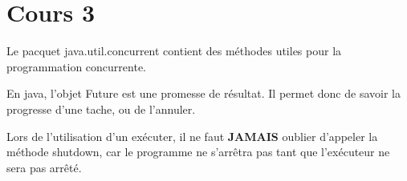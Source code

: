 \section{Cours 3}
Le pacquet java.util.concurrent contient des méthodes utiles pour la programmation concurrente.

En java, l'objet Future est une promesse de résultat. Il permet donc de savoir la progresse d'une tache, ou de
l'annuler.

Lors de l'utilisation d'un exécuter, il ne faut \textbf{JAMAIS} oublier d'appeler la méthode shutdown, car le
programme ne s'arrêtra pas tant que l'exécuteur ne sera pas arrêté.
